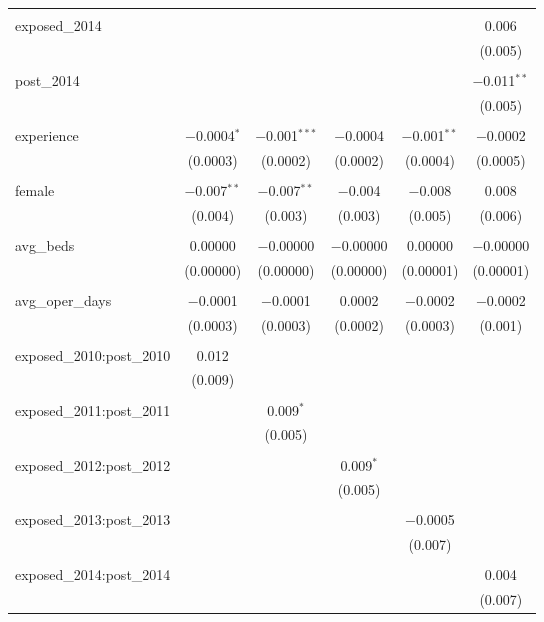 \begin{table}[!htbp]
\begin{adjustbox}{width=\textwidth}
\begin{tabular}{@{\extracolsep{5pt}}lccccc}
  & & & & & \\ 
 exposed\_2014 &  &  &  &  & 0.006 \\ 
  &  &  &  &  & (0.005) \\ 
  & & & & & \\ 
 post\_2014 &  &  &  &  & $-$0.011$^{**}$ \\ 
  &  &  &  &  & (0.005) \\ 
  & & & & & \\ 
 experience & $-$0.0004$^{*}$ & $-$0.001$^{***}$ & $-$0.0004 & $-$0.001$^{**}$ & $-$0.0002 \\ 
  & (0.0003) & (0.0002) & (0.0002) & (0.0004) & (0.0005) \\ 
  & & & & & \\ 
 female & $-$0.007$^{**}$ & $-$0.007$^{**}$ & $-$0.004 & $-$0.008 & 0.008 \\ 
  & (0.004) & (0.003) & (0.003) & (0.005) & (0.006) \\ 
  & & & & & \\ 
 avg\_beds & 0.00000 & $-$0.00000 & $-$0.00000 & 0.00000 & $-$0.00000 \\ 
  & (0.00000) & (0.00000) & (0.00000) & (0.00001) & (0.00001) \\ 
  & & & & & \\ 
 avg\_oper\_days & $-$0.0001 & $-$0.0001 & 0.0002 & $-$0.0002 & $-$0.0002 \\ 
  & (0.0003) & (0.0003) & (0.0002) & (0.0003) & (0.001) \\ 
  & & & & & \\ 
 exposed\_2010:post\_2010 & 0.012 &  &  &  &  \\ 
  & (0.009) &  &  &  &  \\ 
  & & & & & \\ 
 exposed\_2011:post\_2011 &  & 0.009$^{*}$ &  &  &  \\ 
  &  & (0.005) &  &  &  \\ 
  & & & & & \\ 
 exposed\_2012:post\_2012 &  &  & 0.009$^{*}$ &  &  \\ 
  &  &  & (0.005) &  &  \\ 
  & & & & & \\ 
 exposed\_2013:post\_2013 &  &  &  & $-$0.0005 &  \\ 
  &  &  &  & (0.007) &  \\ 
  & & & & & \\ 
 exposed\_2014:post\_2014 &  &  &  &  & 0.004 \\ 
  &  &  &  &  & (0.007) \\ 

\end{tabular}
\end{adjustbox}
\end{table}
